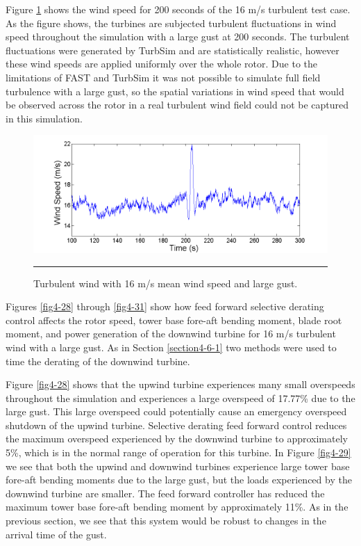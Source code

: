 Figure \ref{fig4-27} shows the wind speed for 200 seconds of the 16 m/s turbulent test case. As the figure shows, the turbines are subjected turbulent fluctuations in wind speed throughout the simulation with a large gust at 200 seconds. The turbulent fluctuations were generated by TurbSim and are statistically realistic, however these wind speeds are applied uniformly over the whole rotor. Due to the limitations of FAST and TurbSim it was not possible to simulate full field turbulence with a large gust, so the spatial variations in wind speed that would be observed across the rotor in a real turbulent wind field could not be captured in this simulation.

\begin{figure}[htbp]
	\centering
		\includegraphics[trim = {1cm 0 2cm 0}, clip, width = \linewidth]{Figures/ch4Figures/fig4-27.png}
		\rule{35em}{0.5pt}
	\caption{Turbulent wind with 16 m/s mean wind speed and large gust.}
	\label{fig4-27}
\end{figure}

Figures \ref{fig4-28} through \ref{fig4-31} show how feed forward selective derating control affects the rotor speed, tower base fore-aft bending moment, blade root moment, and power generation of the downwind turbine for 16 m/s turbulent wind with a large gust. As in Section \ref{section4-6-1} two methods were used to time the derating of the downwind turbine.

Figure \ref{fig4-28} shows that the upwind turbine experiences many small overspeeds throughout the simulation and experiences a large overspeed of 17.77\% due to the large gust. This large overspeed could potentially cause an emergency overspeed shutdown of the upwind turbine. Selective derating feed forward control reduces the maximum overspeed experienced by the downwind turbine to approximately 5\%, which is in the normal range of operation for this turbine. In Figure \ref{fig4-29} we see that both the upwind and downwind turbines experience large tower base fore-aft bending moments due to the large gust, but the loads experienced by the downwind turbine are smaller. The feed forward controller has reduced the maximum tower base fore-aft bending moment by approximately 11\%. As in the previous section, we see that this system would be robust to changes in the arrival time of the gust. 

